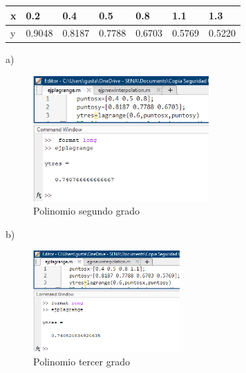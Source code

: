 \documentclass{article}
\begin{document}
\begin{table}[h!]
    \begin{tabular}{lllllll}
        \hline
        \multicolumn{1}{|p{30.865313pt}}{\raggedright x} & \multicolumn{1}{|p{33.12375pt}}{\raggedright 0.2}    & \multicolumn{1}{|p{39.899063pt}|}{\raggedright 0.4}   & \multicolumn{1}{|p{33.876564pt}|}{\raggedright 0.5}   & \multicolumn{1}{|p{33.876564pt}|}{\raggedright 0.8}   & \multicolumn{1}{|p{33.876564pt}|}{\raggedright 1.1}   & \multicolumn{1}{|p{33.876564pt}|}{\raggedright 1.3}    \\
        \hline
        \multicolumn{1}{|p{30.865313pt}}{\raggedright y} & \multicolumn{1}{|p{33.12375pt}}{\raggedright 0.9048} & \multicolumn{1}{|p{39.899063pt}}{\raggedright 0.8187} & \multicolumn{1}{|p{33.876564pt}}{\raggedright 0.7788} & \multicolumn{1}{|p{33.876564pt}}{\raggedright 0.6703} & \multicolumn{1}{|p{33.876564pt}}{\raggedright 0.5769} & \multicolumn{1}{|p{33.876564pt}|}{\raggedright 0.5220} \\
        \hline
    \end{tabular}
\end{table}
a)
\begin{figure}[H]
    \centering
    \includegraphics[width=0.6\textwidth]{33a.png}
    \caption{Polinomio segundo grado}
    \label{fig:imagen1}
    \end{figure}
\newpage
b)
    \begin{figure}[H]
        \centering
        \includegraphics[width=0.5\textwidth]{33b.png}
        \caption{Polinomio tercer grado}
        \label{fig:imagen1}
        \end{figure}
\end{document}
